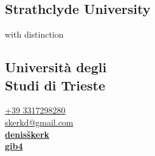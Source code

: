 \documentclass[draft]{dske-resume-openfont}
\begin{document}
%
%
\lastupdated

%
%

%
%

\begin{minipage}[t]{0.31\textwidth} 


{\fontsize{\the\columnTextSize}{\the\columnLineSpace}\selectfont

\subsection{Strathclyde University}
with distinction\\
\vspace{\subsectionspace}

\subsection{Universit\`{a} degli\\ Studi di Trieste}

}


\faPhone\hspace{\iconspace} \href{tel:+393317298280}{+39 3317298280}\\
\faEnvelope\hspace{\iconspace} \href{mailto:skerkd@gmail.com}{skerkd@gmail.com} \\
\faLinkedin\hspace{\iconspace} \href{https://www.linkedin.com/in/denis-\%C5\%A1kerk/}{\bf denisškerk} \\
\faGithub\hspace{\iconspace} \href{https://github.com/gib4}{\bf gib4} \\



\end{minipage}
\end{document}
